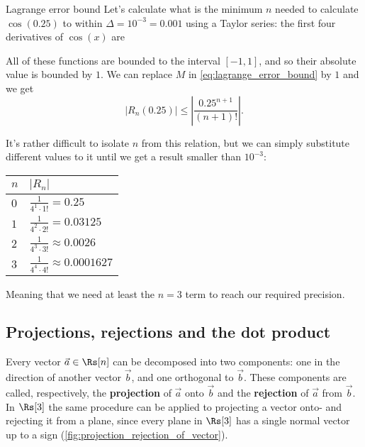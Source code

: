 \begin{example}{Lagrange error bound}{}
	Let's calculate what is the minimum $n$ needed to calculate $\cos(0.25)$ to within $\Delta=10^{-3}=0.001$ using a Taylor series: the first four derivatives of $\cos(x)$ are 

	\begin{center}
	\end{center}

	All of these functions are bounded to the interval $[-1,1]$, and so their absolute value is bounded by $1$. We can replace $M$ in \autoref{eq:lagrange_error_bound} by $1$ and we get
	\[
		\left| R_{n}(0.25) \right| \leq \left| \frac{0.25^{n+1}}{(n+1)!} \right|.
	\]

	It's rather difficult to isolate $n$ from this relation, but we can simply substitute different values to it until we get a result smaller than $10^{-3}$:

	\begin{center}
		\begin{tabular}{l|l}
			\toprule
			$n$ & $\left| R_{n} \right| $ \\ 
			\midrule
			$0$ & $\frac{1}{4^{1}\cdot1!} = 0.25$ \\
			$1$ & $\frac{1}{4^{2}\cdot2!} = 0.03125$ \\
			$2$ & $\frac{1}{4^{3}\cdot3!} \approx 0.0026$ \\
			$3$ & $\frac{1}{4^{4}\cdot4!} \approx 0.0001627$ \\
			\bottomrule
		\end{tabular}
	\end{center}

	\vspace{1em}
	Meaning that we need at least the $n=3$ term to reach our required precision.

\end{example}

\subsection{Projections, rejections and the dot product}
Every vector $\vec{a}\in\Rs[n]$ can be decomposed into two components: one in the direction of another vector $\vec{b}$, and one orthogonal to $\vec{b}$. These components are called, respectively, the \textbf{projection} of $\vec{a}$ onto $\vec{b}$ and the \textbf{rejection} of $\vec{a}$ from $\vec{b}$. In $\Rs[3]$ the same procedure can be applied to projecting a vector onto- and rejecting it from a plane, since every plane in $\Rs[3]$ has a single normal vector up to a sign (\autoref{fig:projection_rejection_of_vector}).

